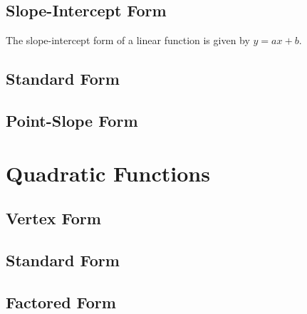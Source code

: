 \documentclass[11pt]{article}
\begin{document}
    \subsection{Slope-Intercept Form}
    The slope-intercept form of a linear
function is given by $ y=ax+b$.
    \subsection{Standard Form}
    \subsection{Point-Slope Form}
\section{Quadratic Functions}
    \subsection{Vertex Form}
    \subsection{Standard Form}
    \subsection{Factored Form}
\end{document}
